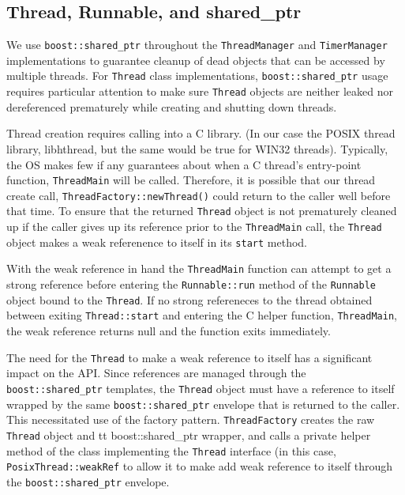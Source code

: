 \documentclass[nocopyrightspace,blockstyle]{sigplanconf}
\begin{document}
\subsection{Thread, Runnable, and shared\_ptr}
We use \texttt{boost::shared\_ptr} throughout the \texttt{ThreadManager} and
\texttt{TimerManager} implementations to guarantee cleanup of dead objects that can
be accessed by multiple threads. For \texttt{Thread} class implementations,
\texttt{boost::shared\_ptr} usage requires particular attention to make sure
\texttt{Thread} objects are neither leaked nor dereferenced prematurely while
creating and shutting down threads.

Thread creation requires calling into a C library. (In our case the POSIX
thread library, libhthread, but the same would be true for WIN32 threads).
Typically, the OS makes few if any guarantees about when a C thread's
entry-point function, \texttt{ThreadMain} will be called. Therefore, it is
possible that our thread create call,
\texttt{ThreadFactory::newThread()} could return to the caller
well before that time. To ensure that the returned \texttt{Thread} object is not
prematurely cleaned up if the caller gives up its reference prior to the
\texttt{ThreadMain} call, the \texttt{Thread} object makes a weak referenence to
itself in its \texttt{start} method.

With the weak reference in hand the \texttt{ThreadMain} function can attempt to get
a strong reference before entering the \texttt{Runnable::run} method of the
\texttt{Runnable} object bound to the \texttt{Thread}. If no strong refereneces to the
thread obtained between exiting \texttt{Thread::start} and entering the C helper
function, \texttt{ThreadMain}, the weak reference returns null and the function 
exits immediately.

The need for the \texttt{Thread} to make a weak reference to itself has a
significant impact on the API. Since references are managed through the
\texttt{boost::shared\_ptr} templates, the \texttt{Thread} object must have a reference
to itself wrapped by the same \texttt{boost::shared\_ptr} envelope that is returned
to the caller. This necessitated use of the factory pattern.
\texttt{ThreadFactory} creates the raw \texttt{Thread} object and
{tt boost::shared\_ptr} wrapper, and calls a private helper method of the class
implementing the \texttt{Thread} interface (in this case, \texttt{PosixThread::weakRef}
 to allow it to make add weak reference to itself through the
 \texttt{boost::shared\_ptr} envelope.
\end{document}
